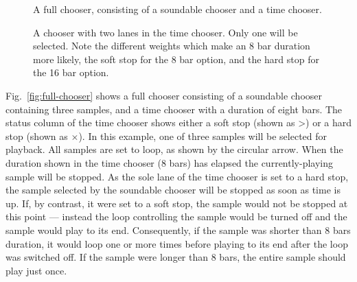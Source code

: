 \documentclass[runningheads,a4paper]{llncs}
\begin{document}
\begin{figure}[!h]
	\begin{floatrow}
	{\caption{A full chooser, consisting of a soundable chooser and a time chooser.}\label{fig:full-chooser}}
	{\caption{A chooser with two lanes in the time chooser. Only one will be selected. Note the different weights which make an 8 bar duration more likely, the soft stop for the 8 bar option, and the hard stop for the 16 bar option.}\label{fig:two-time-choosers}}
	\end{floatrow}
\end{figure}


Fig.~\ref{fig:full-chooser} shows a full chooser consisting of a soundable chooser containing three samples, and a time chooser with a duration of eight bars. The status column of the time chooser shows either a soft stop (shown as \textgreater) or a hard stop (shown as $\times$). In this example, one of three samples will be selected for playback. All samples are set to loop, as shown by the circular arrow. When the duration shown in the time chooser (8 bars) has elapsed the currently-playing sample will be stopped. As the sole lane of the time chooser is set to a hard stop, the sample selected by the soundable chooser will be stopped as soon as time is up. If, by contrast, it were set to a soft stop, the sample would not be stopped at this point --- instead the loop controlling the sample would be turned off and the sample would play to its end. Consequently, if the sample was shorter than 8 bars duration, it would loop one or more times before playing to its end after the loop was switched off. If the sample were longer than 8 bars, the entire sample should play just once.
 
\end{document}
